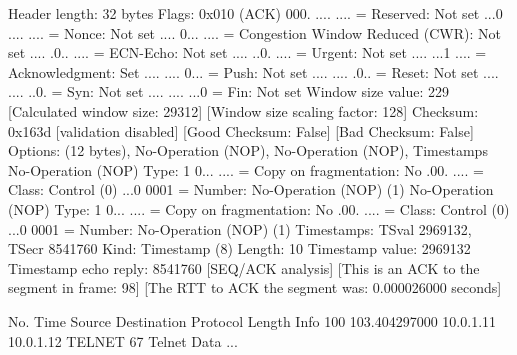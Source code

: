     Header length: 32 bytes
    Flags: 0x010 (ACK)
        000. .... .... = Reserved: Not set
        ...0 .... .... = Nonce: Not set
        .... 0... .... = Congestion Window Reduced (CWR): Not set
        .... .0.. .... = ECN-Echo: Not set
        .... ..0. .... = Urgent: Not set
        .... ...1 .... = Acknowledgment: Set
        .... .... 0... = Push: Not set
        .... .... .0.. = Reset: Not set
        .... .... ..0. = Syn: Not set
        .... .... ...0 = Fin: Not set
    Window size value: 229
    [Calculated window size: 29312]
    [Window size scaling factor: 128]
    Checksum: 0x163d [validation disabled]
        [Good Checksum: False]
        [Bad Checksum: False]
    Options: (12 bytes), No-Operation (NOP), No-Operation (NOP), Timestamps
        No-Operation (NOP)
            Type: 1
                0... .... = Copy on fragmentation: No
                .00. .... = Class: Control (0)
                ...0 0001 = Number: No-Operation (NOP) (1)
        No-Operation (NOP)
            Type: 1
                0... .... = Copy on fragmentation: No
                .00. .... = Class: Control (0)
                ...0 0001 = Number: No-Operation (NOP) (1)
        Timestamps: TSval 2969132, TSecr 8541760
            Kind: Timestamp (8)
            Length: 10
            Timestamp value: 2969132
            Timestamp echo reply: 8541760
    [SEQ/ACK analysis]
        [This is an ACK to the segment in frame: 98]
        [The RTT to ACK the segment was: 0.000026000 seconds]

No.     Time           Source                Destination           Protocol Length Info
    100 103.404297000  10.0.1.11             10.0.1.12             TELNET   67     Telnet Data ...

